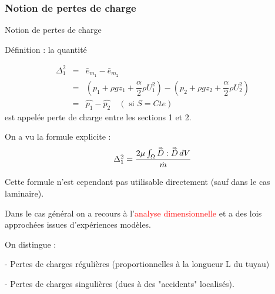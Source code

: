 \subsubsection{Notion de pertes de charge}
\begin{frame}{Notion de pertes de charge}

Définition : la quantité

\begin{eqnarray*}
\Delta _1^2 &=& \bar{e}_{m_1} - \bar{e}_{m_2} \\
               &=& (p_1 + \rho g z_1 
		+ \dfrac{\alpha}{2}\rho U_1^2) -(p_2 + \rho g z_2 
		+ \dfrac{\alpha}{2}\rho U_2^2) \\
	&=& \hat{p_1} - \hat{p_2} \quad (\mbox{ si } S=Cte)
\end{eqnarray*}
	est appelée perte de charge entre les sections 1 et 2.
	
	\medskip
	On a vu la formule explicite :
	$$
	\Delta _1^2 = \frac{2\mu  \int_\Omega \accentset{\Rightarrow}{D} : \accentset{\Rightarrow}{D} \, dV}{\dot m}
	$$
	
	Cette formule n'est cependant pas utilisable directement (sauf dans le cas laminaire).
	
	\medskip

	Dans le cas général on a recours à l'\textcolor{red}{analyse dimensionnelle} et a des lois approchées issues d'expériences modèles.

\medskip
On distingue : 

-  Pertes de charges 	régulières (proportionnelles à la longueur L du tuyau) 

-  Pertes de charges singulières (dues à des "accidents" localisés).
	

\end{frame}
